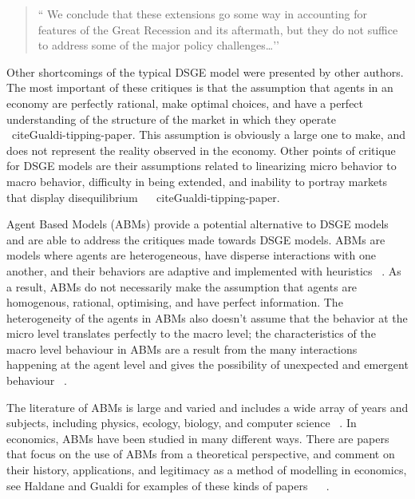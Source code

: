 \documentclass[11pt]{article}
\begin{document}
\begin{quote}
`` We conclude that these extensions go some way in accounting for features of
the Great Recession and its aftermath, but they do not suffice to address some of
the major policy challenges…’’
\end{quote}

Other shortcomings of the typical DSGE model were presented by other authors.
The most important of these critiques is that the assumption that agents in an
economy are perfectly rational, make optimal choices, and have a perfect understanding
of the structure of the market in which they operate ~\cite{Haldane-history-paper} ~cite{Gualdi-tipping-paper}.
This assumption is obviously a large one to make, and does not represent the
reality observed in the economy. Other points of critique for DSGE models are
their assumptions related to linearizing micro behavior to macro behavior,
difficulty in being extended, and inability to portray markets that display
disequilibrium ~\cite{Haldane-history-paper} ~cite{Gualdi-tipping-paper}.

Agent Based Models (ABMs) provide a potential alternative to DSGE models and
are able to address the critiques made towards DSGE models. ABMs are models
where agents are heterogeneous, have disperse interactions with one another,
 and their behaviors are adaptive and implemented with heuristics ~\cite{Haldane-history-paper}.
 As a result, ABMs do not necessarily make the assumption that agents are
 homogenous, rational, optimising, and have perfect information. The heterogeneity
 of the agents in ABMs also doesn’t assume that the behavior at the micro level
 translates perfectly to the macro level; the characteristics of the macro level
 behaviour in ABMs are a result from the many interactions happening at the agent
 level and gives the possibility of unexpected and emergent behaviour ~\cite{Haldane-history-paper}.

The literature of ABMs is large and varied and includes a wide array of years and
subjects, including physics, ecology, biology, and computer science ~\cite{Haldane-history-paper}.
In economics, ABMs have been studied in many different ways. There are papers that
focus on the use of ABMs from a theoretical perspective, and comment on their history,
applications, and legitimacy as a method of modelling in economics, see Haldane and
Gualdi for examples of these kinds of papers ~\cite{Haldane-history-paper} ~\cite{Gualdi-tipping-paper}.
\end{document}
